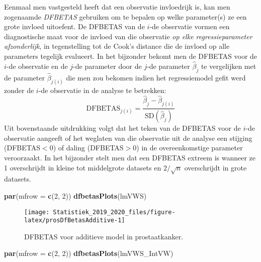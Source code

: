 \documentclass[12pt,dutch,coursenotes]{book}
\newenvironment{Shaded}{\begin{snugshade}}{\end{snugshade}}
\newcommand{\KeywordTok}[1]{\textcolor[rgb]{0.13,0.29,0.53}{\textbf{#1}}}
\newcommand{\DataTypeTok}[1]{\textcolor[rgb]{0.13,0.29,0.53}{#1}}
\newcommand{\DecValTok}[1]{\textcolor[rgb]{0.00,0.00,0.81}{#1}}
\newcommand{\NormalTok}[1]{#1}
\theoremstyle{definition}
\theoremstyle{definition}
\theoremstyle{definition}
\theoremstyle{remark}
\begin{document}
Eenmaal men vastgesteld heeft dat een observatie invloedrijk is, kan men
zogenaamde \emph{DFBETAS} gebruiken om te bepalen op welke parameter(s)
ze een grote invloed uitoefent. De DFBETAS van de \(i\)-de observatie
vormen een diagnostische maat voor de invloed van die observatie
\emph{op elke regressieparameter afzonderlijk}, in tegenstelling tot de
Cook's distance die de invloed op alle parameters tegelijk evalueert. In
het bijzonder bekomt men de DFBETAS voor de \(i\)-de observatie en de
\(j\)-de parameter door de \(j\)-de parameter \(\hat{\beta}_j\) te
vergelijken met de parameter \(\hat{\beta}_{j(i)}\) die men zou bekomen
indien het regressiemodel gefit werd zonder de \(i\)-de observatie in de
analyse te betrekken:
\[\textrm{DFBETAS}_{j(i)}=\frac{\hat{\beta}_{j}-\hat{\beta}_{j(i)}}{\textrm{SD}(\hat{\beta}_{j})}\]
Uit bovenstaande uitdrukking volgt dat het teken van de DFBETAS voor de
\(i\)-de observatie aangeeft of het weglaten van die observatie uit de
analyse een stijging (DFBETAS\(<0\)) of daling (DFBETAS\(>0\)) in de
overeenkomstige parameter veroorzaakt. In het bijzonder stelt men dat
een DFBETAS extreem is wanneer ze 1 overschrijdt in kleine tot
middelgrote datasets en \(2/\sqrt{n}\) overschrijdt in grote datasets.

\begin{Shaded}
\begin{Highlighting}[]
\KeywordTok{par}\NormalTok{(}\DataTypeTok{mfrow =} \KeywordTok{c}\NormalTok{(}\DecValTok{2}\NormalTok{, }\DecValTok{2}\NormalTok{))}
\KeywordTok{dfbetasPlots}\NormalTok{(lmVWS)}
\end{Highlighting}
\end{Shaded}

\begin{figure}

{\centering \texttt{[image: Statistiek\_2019\_2020\_files/figure-latex/prosDfBetasAdditive-1]} 

}

\caption{DFBETAS voor additieve model in prostaatkanker.}\label{fig:prosDfBetasAdditive}
\end{figure}

\begin{Shaded}
\begin{Highlighting}[]
\KeywordTok{par}\NormalTok{(}\DataTypeTok{mfrow =} \KeywordTok{c}\NormalTok{(}\DecValTok{2}\NormalTok{, }\DecValTok{2}\NormalTok{))}
\KeywordTok{dfbetasPlots}\NormalTok{(lmVWS_IntVW)}
\end{Highlighting}
\end{Shaded}
\end{document}
